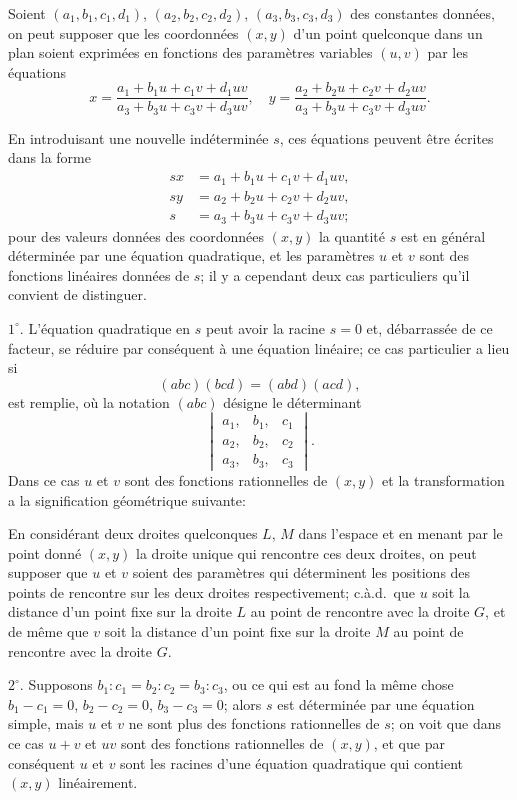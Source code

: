 \documentclass[11pt,a4paper]{article}
\begin{document}
Soient $(a_1, b_1, c_1, d_1)$, $(a_2, b_2, c_2, d_2)$, $(a_3, b_3, c_3, d_3)$ des constantes donn\'{e}es, on peut supposer que les coordonn\'{e}es $(x, y)$ d'un point quelconque dans un plan soient exprim\'{e}es en fonctions des param\`{e}tres variables $(u, v)$ par les \'{e}quations
\[
x = \frac{a_1 + b_1 u + c_1 v + d_1 uv}{a_3 + b_3 u + c_3 v + d_3 uv},\quad
y = \frac{a_2 + b_2 u + c_2 v + d_2 uv}{a_3 + b_3 u + c_3 v + d_3 uv}.
\]

En introduisant une nouvelle ind\'{e}termin\'{e}e $s$, ces \'{e}quations peuvent \^{e}tre \'{e}crites dans la forme
\begin{align*}
sx &= a_1 + b_1 u + c_1 v + d_1 uv, \\
sy &= a_2 + b_2 u + c_2 v + d_2 uv, \\
s &= a_3 + b_3 u + c_3 v + d_3 uv;
\end{align*}
pour des valeurs donn\'{e}es des coordonn\'{e}es $(x, y)$ la quantit\'{e} $s$ est en g\'{e}n\'{e}ral d\'{e}termin\'{e}e par une \'{e}quation quadratique, et les param\`{e}tres $u$ et $v$ sont des fonctions lin\'{e}aires donn\'{e}es de $s$; il y a cependant deux cas particuliers qu'il convient de distinguer.

$1^\circ$. L'\'{e}quation quadratique en $s$ peut avoir la racine $s = 0$ et, d\'{e}barrass\'{e}e de ce facteur, se r\'{e}duire par cons\'{e}quent \`{a} une \'{e}quation lin\'{e}aire; ce cas particulier a lieu si
\[
(abc)(bcd) = (abd)(acd),
\]
est remplie, o\`{u} la notation $(abc)$ d\'{e}signe le d\'{e}terminant
\[
\begin{vmatrix}
a_1, & b_1, & c_1 \\
a_2, & b_2, & c_2 \\
a_3, & b_3, & c_3
\end{vmatrix}.
\]
Dans ce cas $u$ et $v$ sont des fonctions rationnelles de $(x, y)$ et la transformation a la signification g\'{e}om\'{e}trique suivante:

En consid\'{e}rant deux droites quelconques $L$, $M$ dans l'espace et en menant par le point donn\'{e} $(x, y)$ la droite unique qui rencontre ces deux droites, on peut supposer que $u$ et $v$ soient des param\`{e}tres qui d\'{e}terminent les positions des points de rencontre sur les deux droites respectivement; c.\`{a}.d.\ que $u$ soit la distance d'un point fixe sur la droite $L$ au point de rencontre avec la droite $G$, et de m\^{e}me que $v$ soit la distance d'un point fixe sur la droite $M$ au point de rencontre avec la droite $G$.

$2^\circ$. Supposons $b_1 : c_1 = b_2 : c_2 = b_3 : c_3$, ou ce qui est au fond la m\^{e}me chose $b_1 - c_1 = 0$, $b_2 - c_2 = 0$, $b_3 - c_3 = 0$; alors $s$ est d\'{e}termin\'{e}e par une \'{e}quation simple, mais $u$ et $v$ ne sont plus des fonctions rationnelles de $s$; on voit que dans ce cas $u + v$ et $uv$ sont des fonctions rationnelles de $(x, y)$, et que par cons\'{e}quent $u$ et $v$ sont les racines d'une \'{e}quation quadratique qui contient $(x, y)$ lin\'{e}airement.
\end{document}

